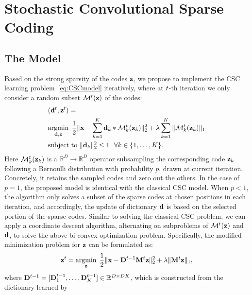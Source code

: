 \section{Stochastic Convolutional Sparse Coding}
\subsection{The Model}
Based on the strong sparsity of the codes $\code$, we propose to
implement the CSC learning problem~\eqref{eq:CSCmodel} iteratively,
where at $t$-th iteration we only consider a random subset
$\mathcal{M}^{\ite}(\code)$ of the codes:
\begin{equation} \label{eq:updatingFilter}
\begin{split}
    & (\filter^{\ite},\code^{\ite}) =  \\
    &\minimize{\filter,\code}  \frac{1}{2}\|\signal - \sum_{k=1}^{K} \filter_k * \mathcal{M}_k^{\ite}(\code_k) \|_2^2 + \lambda \sum_{k=1}^{K}\| \mathcal{M}_k^{\ite}(\code_k) \|_1  \\
    &\text{subject to} ~ \|\filter_k\|^2_2 \leq 1 ~~ \forall k \in \{1,\dots,K\}.
\end{split}
\end{equation}
Here $\mathcal{M}_k^{\ite}(\code_k)$ is a $\mathbb{R}^D \to \mathbb{R}^D$ operator subsampling the
corresponding code $\code_k$ following a Bernoulli distribution with
probability $p$, drawn at current iteration. Concretely, it retains the sampled codes and zero out the others.
In the case of $p=1$, the proposed model is identical with the
classical CSC model. When $p<1$, the algorithm only solves a subset of
the sparse codes at chosen positions in each iteration, and
accordingly, the update of dictionary $\filter$ is based on the selected
portion of the sparse codes. Similar to solving the classical CSC
problem, we can apply a coordinate descent algorithm, alternating on
subproblems of $\mathcal{M}^{\ite}(\code)$ and $\filter$, to solve the above
bi-convex optimization problem. Specifically, the modified
minimization problem for $\code$ can be formulated as:
\begin{equation} \label{eq:updatingCode}
    \code^{\ite} = \minimize{\code} \frac{1}{2}\|\signal - \Filter^{\ite-1} \mask^{\ite} \code \|_2^2 + \lambda \|\mask^{\ite} \code\|_1,
\end{equation}
where $\Filter^{\ite-1} = [\Filter_1^{\ite-1}, \dots, \Filter_K^{\ite-1}] \in \mathbb{R}^{D
  \times DK}$, which is constructed from the dictionary learned by
